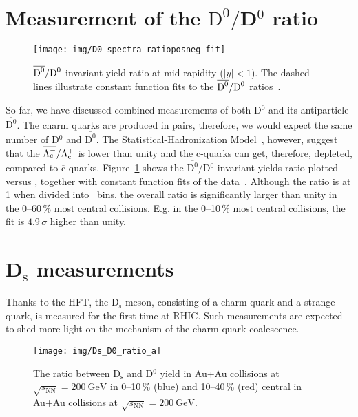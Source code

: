 \section{Measurement of the $\overline{\text{D}^0}/$D$^0$ ratio}

\begin{figure}[!htb]
\begin{center}
 \texttt{[image: img/D0\_spectra\_ratioposneg\_fit]}\\
\end{center}
\caption{\label{dzeroRatio}$\overline{\text{D}^0}/\text{D}^0$ invariant yield ratio at mid-rapidity ($|y| < 1$). The dashed lines illustrate constant function fits to the $\overline{\text{D}^0}/\text{D}^0$ ratios~\cite{D0paper}.}
\end{figure}

So far, we have discussed combined measurements of both D$^0$ and its antiparticle $\overline{\text{D}^0}$\@. The charm quarks are produced in pairs, therefore, we would expect the same number of D$^0$ and $\overline{\text{D}^0}$\@. The Statistical-Hadronization Model~\cite{SHM_LcRatio}, however, suggest that the $\overline{\Lambda_\text{c}^-}/\Lambda_\text{c}^+$ is lower than unity and the c-quarks can get, therefore, depleted, compared to $\overline{\text{c}}$-quarks. Figure~\ref{dzeroRatio} shows the $\overline{\text{D}^0}/$D$^0$ invariant-yields ratio plotted versus \pt, together with constant function fits of the data~\cite{D0paper}\@.  Although the ratio is at 1 when divided into \pt\ bins, the overall ratio is significantly larger than unity in the 0--60$\,\%$ most central collisions. E.g. in the 0--10$\,\%$ most central collisions, the fit is $4.9\,\sigma$ higher than unity.



\section{D$_\text{s}$ measurements}

Thanks to the HFT, the $\mathrm{D_s}$ meson, consisting of a charm quark and a strange quark,
is measured for the first time at RHIC\@. Such measurements are expected to
shed more light on the mechanism of the charm quark coalescence.

\begin{figure}[!htb]
\begin{center}
  \texttt{[image: img/Ds\_D0\_ratio\_a]}\\
\end{center} 
\caption{\label{Ds}The ratio between D$_\mathrm{s}$ and D$^0$ yield in
Au+Au collisions at $\sqrt{s_\mathrm{NN}} = \SI{200}{\giga\electronvolt}$
in 0--10$\,\%$ (blue) and 10--40$\,\%$ (red) central in Au+Au
collisions at $\sqrt{s_\mathrm{NN}} = \SI{200}{\giga\electronvolt}$.}
\end{figure}

